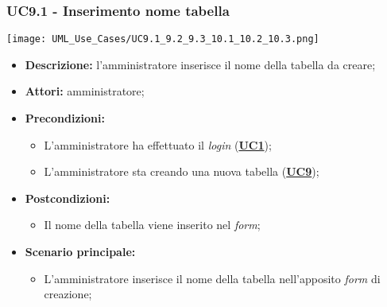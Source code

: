 \subsubsection{UC9.1 - Inserimento nome tabella}
\label{sec:UC9.1}
\texttt{[image: UML\_Use\_Cases/UC9.1\_9.2\_9.3\_10.1\_10.2\_10.3.png]}
\begin{itemize}
	\item \textbf{Descrizione:} l’amministratore inserisce il nome della tabella da creare;
	\item \textbf{Attori:} amministratore;
	\item \textbf{Precondizioni:} 
	\begin{itemize}
		\item L’amministratore ha effettuato il \textit{login} (\hyperref[sec:UC1]{\textbf{UC1}});
		\item L’amministratore sta creando una nuova tabella (\hyperref[sec:UC9]{\textbf{UC9}});
	\end{itemize}
	\item \textbf{Postcondizioni:} 
	\begin{itemize}
		\item Il nome della tabella viene inserito nel \textit{form};
	\end{itemize}
	\item \textbf{Scenario principale:} 
	\begin{itemize}
		\item L’amministratore inserisce il nome della tabella nell'apposito \textit{form} di creazione;
	\end{itemize}
\end{itemize}

